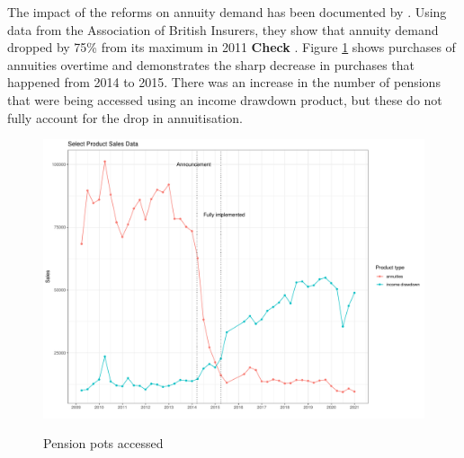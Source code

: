 \documentclass[12pt]{article}
\begin{document}
The impact of the reforms on annuity demand has been documented by \cite{cannon_et_al_nier_2016}.
Using data from the Association of British Insurers, they show that annuity demand dropped by 75\% from
its maximum in 2011
\textbf{Check}
. Figure \ref{fig:annovertime} shows purchases of annuities overtime and demonstrates the sharp decrease
in purchases that happened from 2014 to 2015. There was an increase in the number of pensions that were
being accessed using an income drawdown product, but these do not fully account for the drop in annuitisation.
\begin{figure}[h]
    \caption{Pension pots accessed }
    \centering
    \includegraphics[width=0.7\columnwidth]{figures/annuity_overtime.pdf}
    \label{fig:annovertime}


\end{figure}
\end{document}
